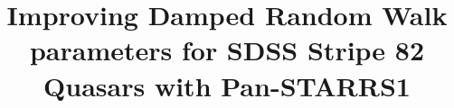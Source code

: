 \documentclass[twocolumn]{aastex62}
\begin{document}
\title{Improving Damped Random Walk parameters for SDSS Stripe 82 Quasars with Pan-STARRS1}



\end{document}
